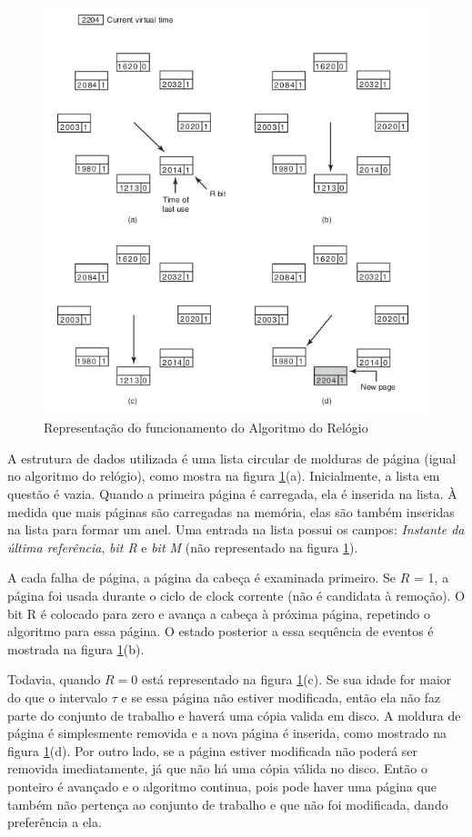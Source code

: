 \begin{figure}
	\includegraphics[scale=0.6]{ram-wsclock-1.png}
    \centering
    \caption{Representação do funcionamento do Algoritmo do Relógio}
    \label{ram-wsclock-1}
\end{figure}

A estrutura de dados utilizada é uma lista circular de molduras de página (igual no algoritmo do relógio), como mostra na figura \ref{ram-wsclock-1}(a). Inicialmente, a lista em questão é vazia. Quando a primeira página é carregada, ela é inserida na lista. À medida que mais páginas são carregadas na memória, elas são também inseridas na lista para formar um anel. Uma entrada na lista possui os campos: \textit{Instante da última referência}, \textit{bit R} e \textit{bit M} (não representado na figura \ref{ram-wsclock-1}). 

A cada falha de página, a página da cabeça é examinada primeiro. Se $R$ = 1, a página foi usada durante o ciclo de clock corrente (não é candidata à remoção). O bit R é colocado para zero e avança a cabeça à próxima página, repetindo o algoritmo para essa página. O estado posterior a essa sequência de eventos é mostrada na figura \ref{ram-wsclock-1}(b).

Todavia, quando $R = 0$ está representado na figura \ref{ram-wsclock-1}(c). Se sua idade for maior do que o intervalo $\tau$ e se essa página não estiver modificada, então ela não faz parte do conjunto de trabalho e haverá uma cópia valida em disco. A moldura de página é simplesmente removida e a nova página é inserida, como mostrado na figura \ref{ram-wsclock-1}(d). Por outro lado, se a página estiver modificada não poderá ser removida imediatamente, já que não há uma cópia válida no disco. Então o ponteiro é avançado e o algoritmo continua, pois pode haver uma página que também não pertença ao conjunto de trabalho e que não foi modificada, dando preferência a ela.

